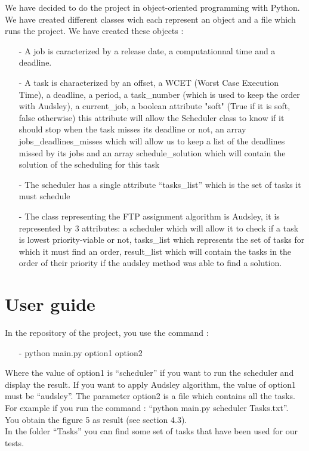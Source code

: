 \documentclass[a4paper,12pt]{article}
\begin{document}
We have decided to do the project in object-oriented programming with Python. We have created different classes wich each represent an object and a file which runs the project. We have created these objects : 

\begin{itemize}
  \item[-] A job is caracterized by a release date, a computationnal time and a deadline.
  \item[-] A task is characterized by an offset, a WCET (Worst Case Execution Time), a deadline, a period, a task\_number (which is used to keep the order with Audsley), a current\_job, a boolean attribute "soft" (True if it is soft, false otherwise) this attribute will allow the Scheduler class to know if it should stop when the task misses its deadline or not, an array jobs\_deadlines\_misses which will allow us to keep a list of the deadlines missed by its jobs and an array schedule\_solution which will contain the solution of the scheduling for this task 
  \item[-] The scheduler has a single attribute “tasks\_list” which is the set of tasks it must schedule 
  \item[-] The class representing the FTP assignment algorithm is Audsley, it is represented by 3 attributes: a scheduler which will allow it to check if a task is lowest priority-viable or not, tasks\_list which represents the set of tasks for which it must find an order, result\_list which will contain the tasks in the order of their priority if the audsley method was able to find a solution. 
\end{itemize}




\newpage

\section{User guide}

In the repository of the project, you use the command : \\
\begin{itemize}
\item[-] python main.py option1 option2
\end{itemize}

\noindent
Where the value of option1 is ``scheduler'' if you want to run the scheduler and display the result. If you want to apply Audsley algorithm, the value of option1 must be ``audsley''. The parameter option2 is a file which contains all the tasks. For example if you run the command : ``python main.py scheduler Tasks.txt''. You obtain the figure 5 as result (see section 4.3). \\
\noindent In the folder ``Tasks'' you can find some set of tasks that have been used for our tests.
\end{document}
